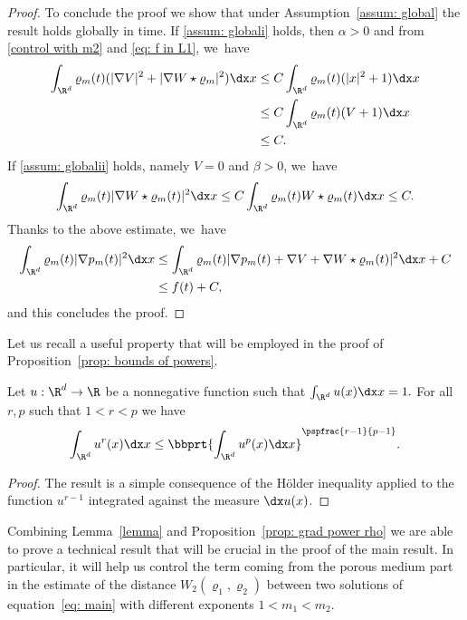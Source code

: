 \begin{proof}
To conclude the proof we show that under Assumption~\ref{assum: global} the result holds globally in time.
If \eqref{assum: globali} holds, then $\alpha >0$ and from \eqref{control with m2} and \eqref{eq: f in L1}, we~have
\begin{align*}
\int_{\R^d} \varrho_m(t) (|\nabla V|^2 + |\nabla W\star \varrho_m|^2) \dx x&\leq C \int_{\R^d} \varrho_m(t) (|x|^2+1)\dx x \\&\leq C \int_{\R^d} \varrho_m(t) (V+1)\dx x\\&\leq C.
\end{align*}
If \eqref{assum: globalii} holds, namely $V=0$ and $\beta > 0$, we~have
\begin{equation*}
\int_{\R^d} \varrho_m(t) |\nabla W\star \varrho_m(t)|^2 \dx x \leq C \int_{\R^d} \varrho_m(t) W\star \varrho_m(t)\dx x\leq C.
\end{equation*}
Thanks to the above estimate, we~have
\begin{align*}
\int_{\R^d} \varrho_m(t) |\nabla p_m(t)|^2 \dx x&\leq \int_{\R^d} \varrho_m(t) |\nabla p_m(t)+\nabla V +\nabla W\star \varrho_m(t)|^2 \dx x + C\\
&\leq f(t) + C,
\end{align*}
and this concludes the proof.
\end{proof}

Let us recall a useful property that will be employed in the proof of Proposition~\ref{prop: bounds of powers}.
\begin{lemma}\label{lemma}
Let $u:\R^d\to \R$ be a nonnegative function such that $\int_{\R^d} u(x)\dx x=1.$ For all $r,p$ such that $1<r<p$ we have
\begin{equation*}
\int_{\R^d} u^r(x) \dx x \leq \bbprt{\int_{\R^d}u^p(x) \dx x}^{\pspfrac{r-1}{p-1}}.
\end{equation*}
\end{lemma}
\begin{proof}
The result is a simple consequence of the Hölder inequality applied to the function $u^{r-1}$ integrated against the measure $\dx u(x)$.
\end{proof}

Combining Lemma~\ref{lemma} and Proposition~\ref{prop: grad power rho} we are able to prove a technical result that will be crucial in the proof of the main result. In particular, it will help us control the term coming from the porous medium part in the estimate of the distance $W_2(\varrho_1,\varrho_2)$ between two solutions of equation~\eqref{eq: main} with different exponents \hbox{$1<m_1< m_2$}.

